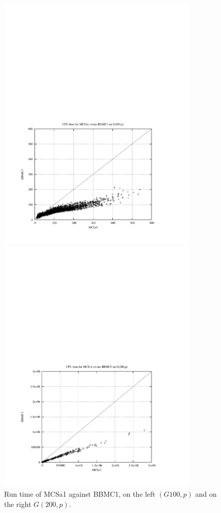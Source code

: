 \documentclass{l4proj}
\begin{document}
\begin{figure}
\vspace{-8cm}
\begin{center}
\hspace{-1.5cm}
\begin{minipage}[t]{0.49\textwidth}
\includegraphics[height=12.5cm]{mcsVbbmc-100.pdf}
\end{minipage}
\hfill
\begin{minipage}[t]{0.49\textwidth}
\includegraphics[height=12.5cm]{mcsVbbmc-200.pdf}
\end{minipage}
\end{center}
\caption{Run time of MCSa1 against BBMC1, on the left $(G100,p)$ and on the right $G(200,p)$.}
\label{mcsVbbmc}
\end{figure}
\end{document}
